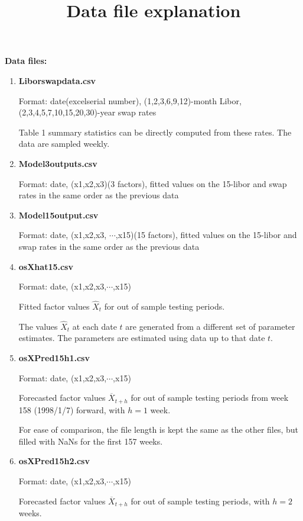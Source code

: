 \documentclass[11pt]{article}
\begin{document}
\title{\textbf{Data file explanation}}

\newpage \renewcommand{\thefootnote}{\arabic{footnote}}
\setcounter{page}{1}


{\bf \large Data files:}
\begin{enumerate}
\item {\bf	Liborswapdata.csv}

Format: date(excelserial number), (1,2,3,6,9,12)-month Libor, (2,3,4,5,7,10,15,20,30)-year swap rates

Table 1 summary statistics can be directly computed from these rates. The data are sampled weekly.

\item {\bf	Model3outputs.csv}

Format: date, (x1,x2,x3)(3 factors), fitted values on the 15-libor and swap rates in the same order as the previous data

\item {\bf	Model15output.csv}

Format: date, (x1,x2,x3, $\cdots$,x15)(15 factors), fitted values on the 15-libor and swap rates in the same order as the previous data

\item {\bf	osXhat15.csv}

Format: date, (x1,x2,x3,$\cdots$,x15)


Fitted factor values $\widehat{X}_{t}$ for out of sample testing periods.

The values $\widehat{X}_t$ at each date $t$ are generated from a different set of parameter estimates. The parameters are estimated using data up to that date $t$.

\item {\bf	osXPred15h1.csv}

Format: date, (x1,x2,x3,$\cdots$,x15)

Forecasted factor values $\overline{X}_{t+h}$ for out of sample testing periods from week 158 (1998/1/7) forward, with $h=1$ week.

For ease of comparison, the file length is kept the same as the other files, but filled with NaNs for the first 157 weeks.




\item {\bf	osXPred15h2.csv}

Format: date, (x1,x2,x3,$\cdots$,x15)

Forecasted factor values $\overline{X}_{t+h}$ for out of sample testing periods, with $h=2$ weeks.



\end{enumerate}
\end{document}
